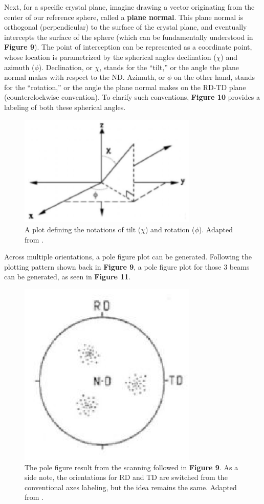 \documentclass[10pt]{article}
\begin{document}
Next, for a specific crystal plane, imagine drawing a vector originating from the center of our reference sphere, called a \textbf{plane normal}. This plane normal is orthogonal
(perpendicular) to the surface of the crystal plane, and eventually intercepts the surface of the sphere (which can be fundamentally understood in \textbf{Figure 9}). The point of interception can be
represented as a coordinate point, whose location is parametrized by the spherical angles declination ($\chi$) and azimuth ($\phi$). 
Declination, or $\chi$, stands for the “tilt,” or the angle the plane normal makes with respect to the ND. 
Azimuth, or $\phi$ on the other hand, stands for the “rotation,” or the angle the  
plane normal makes on the RD-TD plane (counterclockwise convention). To clarify such conventions, \textbf{Figure 10} provides a labeling 
of both these spherical angles.
\begin{figure}[h]
    \centering
    \includegraphics[width=8.5cm]{fig10}
    \caption{\label{tab1}A plot defining the notations of tilt ($\chi$) and rotation ($\phi$). Adapted from \cite{ref10}.} 
    \end{figure}

Across multiple orientations, a pole figure plot can be generated. Following the plotting pattern shown back in \textbf{Figure 9}, a pole figure plot 
for those 3 beams can be generated, as seen in \textbf{Figure 11}.
\begin{figure}[h]
    \centering
    \includegraphics[width=8.5cm]{fig11}
    \caption{\label{tab1} The pole figure result from the scanning followed in \textbf{Figure 9}. As a side note, 
    the orientations for RD and TD are switched from the conventional axes labeling, but the idea remains the same. Adapted from \cite{ref09}.} 
    \end{figure}
\end{document}
